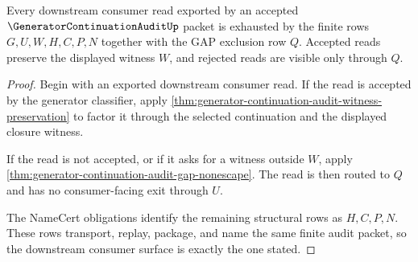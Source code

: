 \begin{theorem}
\label{thm:generator-continuation-audit-downstream-consumer-surface}
Every downstream consumer read exported by an accepted $\GeneratorContinuationAuditUp$ packet is exhausted by the finite rows $G,U,W,H,C,P,N$ together with the GAP exclusion row $Q$. Accepted reads preserve the displayed witness $W$, and rejected reads are visible only through $Q$.
\end{theorem}
\begin{proof}
Begin with an exported downstream consumer read. If the read is accepted by the generator classifier, apply \autoref{thm:generator-continuation-audit-witness-preservation} to factor it through the selected continuation and the displayed closure witness.

If the read is not accepted, or if it asks for a witness outside $W$, apply \autoref{thm:generator-continuation-audit-gap-nonescape}. The read is then routed to $Q$ and has no consumer-facing exit through $U$.

The NameCert obligations identify the remaining structural rows as $H,C,P,N$. These rows transport, replay, package, and name the same finite audit packet, so the downstream consumer surface is exactly the one stated.
\end{proof}


\begin{closurestatus}{\GeneratorContinuationAuditUp}
  \theoryclosure{\seedClosure}
  \formalstatus{\unformalizedV}
\end{closurestatus}
